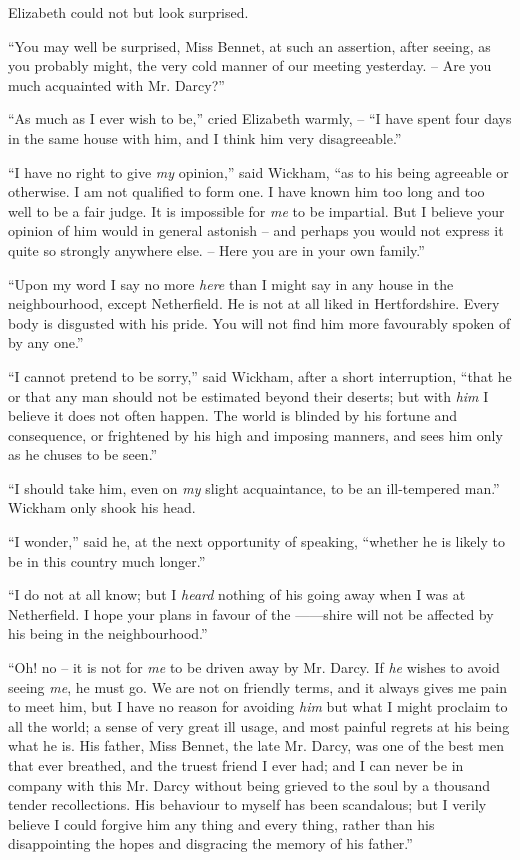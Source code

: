 Elizabeth could not but look surprised.

“You may well be surprised, Miss Bennet, at such an
assertion, after seeing, as you probably might, the very
cold manner of our meeting yesterday. -- Are you much
acquainted with Mr. Darcy?”

“As much as I ever wish to be,” cried Elizabeth
warmly, -- “I have spent four days in the same house
with him, and I think him very disagreeable.”

“I have no right to give \textit{my} opinion,” said Wickham,
“as to his being agreeable or otherwise. I am not qualified
to form one. I have known him too long and too well to
be a fair judge. It is impossible for \textit{me} to be impartial.
But I believe your opinion of him would in general
astonish -- and perhaps you would not express it quite so
strongly anywhere else. -- Here you are in your own family.”

“Upon my word I say no more \textit{here} than I might say
in any house in the neighbourhood, except Netherfield.
He is not at all liked in Hertfordshire. Every body is
disgusted with his pride. You will not find him more
favourably spoken of by any one.”

“I cannot pretend to be sorry,” said Wickham, after
a short interruption, “that he or that any man should
not be estimated beyond their deserts; but with \textit{him}
I believe it does not often happen. The world is blinded
by his fortune and consequence, or frightened by his high
and imposing manners, and sees him only as he chuses to
be seen.”

“I should take him, even on \textit{my} slight acquaintance,
to be an ill-tempered man.” Wickham only shook his
head.

“I wonder,” said he, at the next opportunity of
speaking, “whether he is likely to be in this country much
longer.”

“I do not at all know; but I \textit{heard} nothing of his going
away when I was at Netherfield. I hope your plans in
favour of the ------shire will not be affected by his being
in the neighbourhood.”

“Oh! no -- it is not for \textit{me} to be driven away by
Mr. Darcy. If \textit{he} wishes to avoid seeing \textit{me}, he must go.
We are not on friendly terms, and it always gives me pain
to meet him, but I have no reason for avoiding \textit{him}
but what I might proclaim to all the world; a sense of
very great ill usage, and most painful regrets at his being
what he is. His father, Miss Bennet, the late Mr. Darcy,
was one of the best men that ever breathed, and the truest
friend I ever had; and I can never be in company with
this Mr. Darcy without being grieved to the soul by a
thousand tender recollections. His behaviour to myself
has been scandalous; but I verily believe I could forgive
him any thing and every thing, rather than his disappointing
the hopes and disgracing the memory of his father.”

